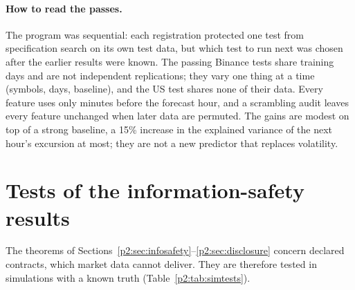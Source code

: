     \paragraph{How to read the passes.} The program was sequential: each registration protected one test from specification search on its own test data, but which test to run next was chosen after the earlier results were known. The passing Binance tests share training days and are not independent replications; they vary one thing at a time (symbols, days, baseline), and the US test shares none of their data. Every feature uses only minutes before the forecast hour, and a scrambling audit leaves every feature unchanged when later data are permuted. The gains are modest on top of a strong baseline, a 15\% increase in the explained variance of the next hour's excursion at most; they are not a new predictor that replaces volatility.

    \section{Tests of the information-safety results}\label{p2:sec:istests}

    The theorems of Sections~\ref{p2:sec:infosafety}--\ref{p2:sec:disclosure} concern declared contracts, which market data cannot deliver. They are therefore tested in simulations with a known truth (Table~\ref{p2:tab:simtests}).
    
